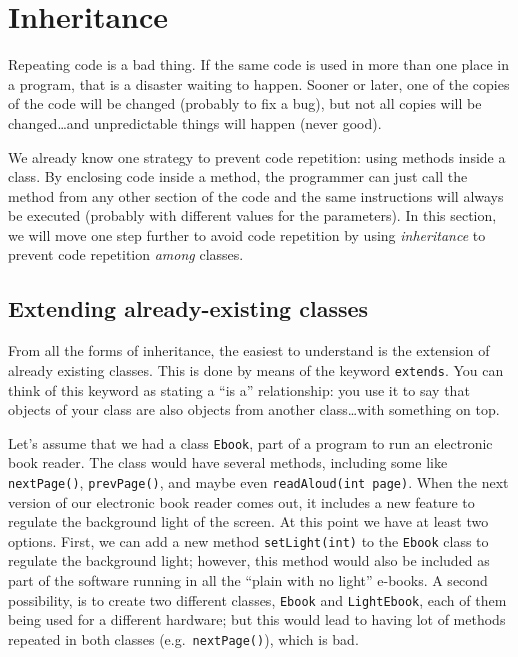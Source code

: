 \section{Inheritance}
\label{sec:inheritance-1}

Repeating code is a bad thing. If the same code is used in more than
one place in a program, that is a disaster waiting to happen. Sooner or
later, one of the copies of the code will be changed (probably to fix
a bug), but not all copies will be changed\ldots and unpredictable things
will happen (never good). 

We already know one strategy to prevent code repetition: using methods 
inside a class. By enclosing code inside a method, the
programmer can just call the method from any other section of the code
and the same instructions will always be executed (probably with
different values for the parameters). In this section, we will move
one step further to avoid code repetition by using \emph{inheritance} to
prevent code repetition \emph{among} classes. 

\subsection{Extending already-existing classes}
\label{sec:extend-alre-exist}

From all the forms of inheritance, the easiest to understand is the
extension of already existing classes. This is done by means of the
keyword \verb+extends+. You can think of this keyword as stating a
``is a'' relationship: you use it to say that objects of your class
are also objects from another class\ldots with something on top.

Let's assume that we had a class \verb+Ebook+,
part of a program to run an electronic book reader. The class would
have
several methods, including some like \verb+nextPage()+,
\verb+prevPage()+, and maybe even \verb+readAloud(int page)+. When the next
version of our electronic book reader comes out, it includes a new
feature to regulate the background light of the screen. At this point
we have at least two options. First, we can add a new method
\verb+setLight(int)+ to the \verb+Ebook+ class to regulate the
background light; however, this method would also be included as part of the
software running in all the ``plain with no light'' e-books.
A second possibility, is to create two different classes,
\verb+Ebook+ and \verb+LightEbook+, each of them being used for a different
hardware; but this would lead to having lot of methods repeated in
both classes (e.g.~\verb+nextPage()+), which is
bad. 

